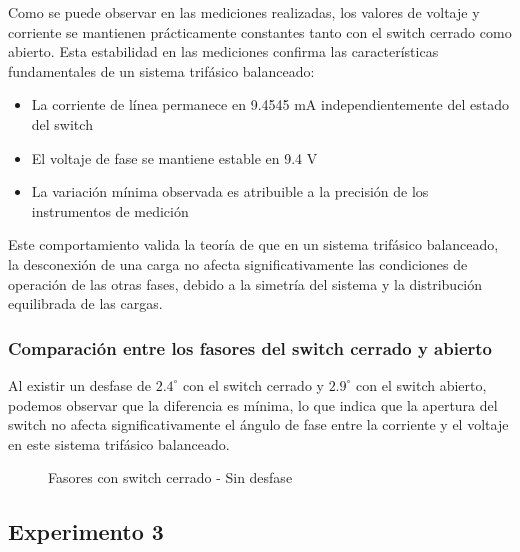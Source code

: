 \documentclass[12pt, letterpaper]{article}
\begin{document}
Como se puede observar en las mediciones realizadas, los valores de voltaje y corriente se mantienen prácticamente constantes tanto con el switch cerrado como abierto. Esta estabilidad en las mediciones confirma las características fundamentales de un sistema trifásico balanceado:

\begin{itemize}
	\item La corriente de línea permanece en 9.4545 mA independientemente del estado del switch
	\item El voltaje de fase se mantiene estable en 9.4 V
	\item La variación mínima observada es atribuible a la precisión de los instrumentos de medición
\end{itemize}

Este comportamiento valida la teoría de que en un sistema trifásico balanceado, la desconexión de una carga no afecta significativamente las condiciones de operación de las otras fases, debido a la simetría del sistema y la distribución equilibrada de las cargas.

\subsubsection{Comparación entre los fasores del switch cerrado y abierto}

Al existir un desfase de \(2.4^\circ\) con el switch cerrado y \(2.9^\circ\) con el switch abierto, podemos observar que la diferencia es mínima, lo que indica que la apertura del switch no afecta significativamente el ángulo de fase entre la corriente y el voltaje en este sistema trifásico balanceado.

\begin{figure}[H]
	\centering
	\caption{Fasores con switch cerrado - Sin desfase}
\end{figure}

\subsection{Experimento 3}
\end{document}
